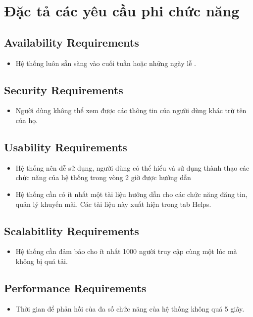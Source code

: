 \section{Đặc tả các yêu cầu phi chức năng}
\subsection{Availability Requirements}
\begin{itemize}
	\item Hệ thống luôn sẵn sàng vào cuối tuần hoặc những ngày lễ .
\end{itemize}


\subsection{Security Requirements}
\begin{itemize}
	\item Người dùng không thể xem được các thông tin của người dùng khác trừ tên của họ.
\end{itemize}

\subsection{Usability Requirements}
\begin{itemize}
	\item Hệ thống nên dễ sử dụng, người dùng có thể hiểu và sử dụng thành thạo các chức năng của hệ thống trong vòng 2 giờ được hướng dẫn
	\item Hệ thống cần có ít nhất một tài liệu hướng dẫn cho các chức năng đăng tin, quản lý khuyến mãi. Các tài liệu này xuất hiện trong tab Helps. 
\end{itemize}

\subsection{Scalabitlity Requirements}
\begin{itemize}
	\item Hệ thống cần đảm bảo cho ít nhất 1000 người truy cập cùng một lúc mà không bị quá tải.
\end{itemize}

\subsection{Performance Requirements}
\begin{itemize}
	\item Thời gian để phản hồi của đa số chức năng của hệ thống không quá 5 giây.
\end{itemize}
